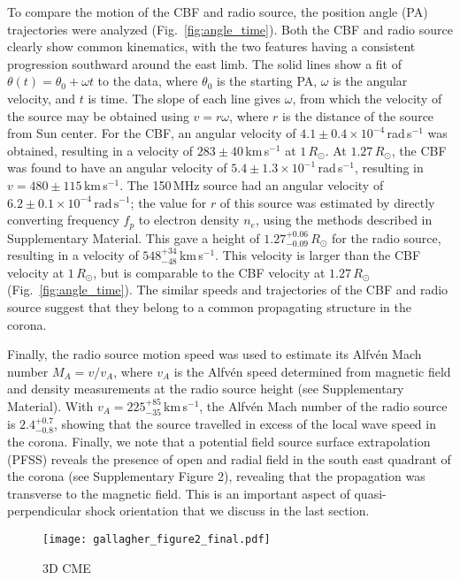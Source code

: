 To compare the motion of the CBF and radio source, the position angle (PA) trajectories were analyzed (Fig.~\ref{fig:angle_time}). Both the CBF and radio source clearly show common kinematics, with the two features having a consistent progression southward around the east limb. The solid lines show a fit of $\theta(t) = \theta_0 + \omega t$ to the data, where $\theta_0$ is the starting PA, $\omega$ is the angular velocity, and $t$ is time. The slope of each line gives $\omega$, from which the velocity of the source may be obtained using $v=r\omega$, where $r$ is the distance of the source from Sun center. 
For the CBF, an angular velocity of $4.1\pm0.4\times10^{-4}$\,rad\,s$^{-1}$ was obtained, resulting in a velocity of $283\pm40$\,km\,s$^{-1}$ at $1\,R_{\odot}$.
At $1.27\,R_{\odot}$, the CBF was found to have an angular velocity of $5.4\pm1.3\times10^{-1}$\,rad\,s$^{-1}$, resulting in $v=480\pm115$\,km\,s$^{-1}$.
The 150\,MHz source had an angular velocity of $6.2\pm0.1\times10^{-4}\,\mathrm{rad\,s^{-1}} $; the value for $r$ of this source was estimated by directly converting frequency $f_p$ to electron density $n_e$, using the methods described in Supplementary Material. This gave a height of $1.27^{+0.06}_{-0.09}\,R_{\odot}$ for the radio source, resulting in a velocity of $548^{+34}_{-48}$\,km\,s$^{-1}$. This velocity is larger than the CBF velocity at $1\,R_{\odot}$, but is comparable to the CBF velocity at $1.27\,R_{\odot}$ (Fig.~\ref{fig:angle_time}). 
The similar speeds and trajectories of the CBF and radio source suggest that they belong to a common propagating structure in the corona.

Finally, the radio source motion speed was used to estimate its Alfv\'{e}n Mach number $M_A = v/v_A$, where $v_A$ is the Alfv\'{e}n speed determined from magnetic field and density measurements at the radio source height (see Supplementary Material). With $v_A=225^{+85}_{-35}$\,km\,s$^{-1}$, the Alfv\'{e}n Mach number of the radio source is $2.4^{+0.7}_{-0.8}$, showing that the source travelled in excess of the local wave speed in the corona. Finally, we note that a potential field source surface extrapolation (PFSS) reveals the presence of open and radial field in the south east quadrant of the corona (see Supplementary Figure 2), revealing that the propagation was transverse to the magnetic field. This is an important aspect of quasi-perpendicular shock orientation that we discuss in the last section.
\begin{figure}[!ht]
\begin{center}
\texttt{[image: gallagher\_figure2\_final.pdf]}
\caption{3D CME}
\label{fig:3d_cme}
\end{center}
\end{figure}

